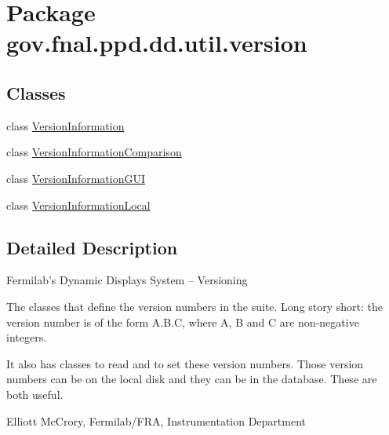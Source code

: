 \hypertarget{namespacegov_1_1fnal_1_1ppd_1_1dd_1_1util_1_1version}{\section{Package gov.\-fnal.\-ppd.\-dd.\-util.\-version}
\label{namespacegov_1_1fnal_1_1ppd_1_1dd_1_1util_1_1version}
}
\subsection*{Classes}
\begin{DoxyCompactItemize}
\item 
class \hyperlink{classgov_1_1fnal_1_1ppd_1_1dd_1_1util_1_1version_1_1VersionInformation}{Version\-Information}
\item 
class \hyperlink{classgov_1_1fnal_1_1ppd_1_1dd_1_1util_1_1version_1_1VersionInformationComparison}{Version\-Information\-Comparison}
\item 
class \hyperlink{classgov_1_1fnal_1_1ppd_1_1dd_1_1util_1_1version_1_1VersionInformationGUI}{Version\-Information\-G\-U\-I}
\item 
class \hyperlink{classgov_1_1fnal_1_1ppd_1_1dd_1_1util_1_1version_1_1VersionInformationLocal}{Version\-Information\-Local}
\end{DoxyCompactItemize}


\subsection{Detailed Description}
Fermilab's Dynamic Displays System -- Versioning 

The classes that define the version numbers in the suite. Long story short\-: the version number is of the form A.\-B.\-C, where A, B and C are non-\/negative integers. 

It also has classes to read and to set these version numbers. Those version numbers can be on the local disk and they can be in the database. These are both useful. 

Elliott Mc\-Crory, Fermilab/\-F\-R\-A, Instrumentation Department 